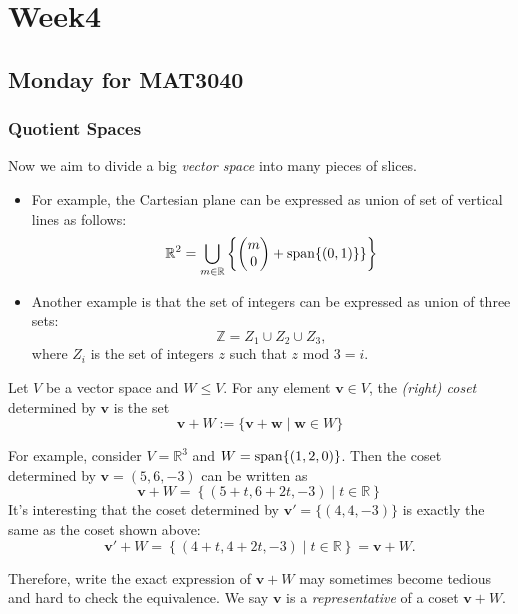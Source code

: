 \chapter{Week4}
\section{Monday for MAT3040}

\subsection{Quotient Spaces}

Now we aim to divide a big \emph{vector space} into many pieces of slices. 
\begin{itemize}
\item
For example, the Cartesian plane can be expressed as union of set of vertical lines as follows:
\[
\mathbb{R}^2 = \bigcup_{m\in\mathbb{R}}\left\{\begin{pmatrix}
m\\0
\end{pmatrix}+
\operatorname{span}\{(0,1)\}\}
\right\}
\]
\item
Another example is that the set of integers can be expressed as union of three sets:
\[
\mathbb{Z}
=
Z_1\cup Z_2\cup Z_3,
\]
where $Z_i$ is the set of integers $z$ such that $z\text{ mod }3 = i$.
\end{itemize}

\begin{definition}[Coset]
Let $V$ be a vector space and $W\le V$. For any element $\bm v\in V$, the \emph{(right) coset} determined by $\bm v$ is the set
\[
\bm v+W:=\{\bm v+\bm w\mid\bm w\in W\}
\]
\end{definition}

For example, consider $V=\mathbb{R}^3$ and $W=\operatorname{span}\{(1,2,0)\}$. Then the coset determined by $\bm v=(5,6,-3)$ can be written as
\[
\bm v+W=\left\{(5+t,6+2t,-3)\mid t\in\mathbb{R}\right\}
\]
It's interesting that the coset determined by $\bm v'=\{(4,4,-3)\}$ is exactly the same as the coset shown above:
\[
\bm v'+W=\left\{(4+t,4+2t,-3)\mid t\in\mathbb{R}\right\}=\bm v+W.
\]

Therefore, write the exact expression of $\bm v+W$ may sometimes become tedious and hard to check the equivalence. We say $\bm v$ is a \emph{representative} of a coset $\bm v+W$.

